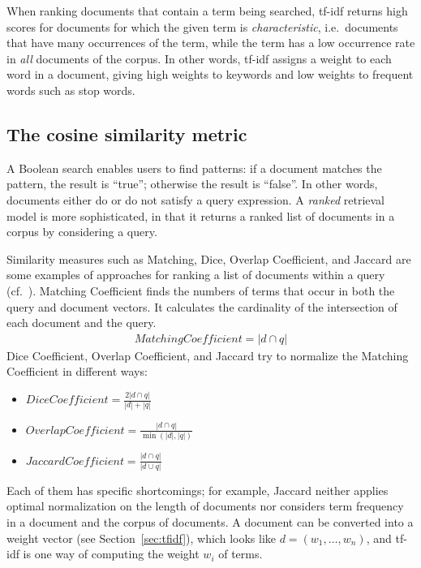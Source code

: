 \documentclass{IOS-Book-Article}
\begin{document}
When ranking documents that contain a term being searched, tf-idf returns high scores for documents for which the given term is \emph{characteristic}, i.e.\ documents that have many occurrences of the term, while the term has a low occurrence rate in \emph{all} documents of the corpus.
In other words, tf-idf assigns a weight to each word in a document, giving high weights to keywords and low weights to frequent words such as stop words.

\subsection{The cosine similarity metric}
\label{sec:cosine}
A Boolean search enables users to find patterns: if a document matches the pattern, the result is “true”; otherwise the result is “false”.
In other words, documents either do or do not satisfy a query expression.
A \emph{ranked} retrieval model is more sophisticated, in that it returns a ranked list of documents in a corpus by considering a query. 

Similarity measures such as Matching, Dice, Overlap Coefficient, and Jaccard are some examples of approaches for ranking a list of documents within a query (cf.~\citet{ChristopherD1999}).
Matching Coefficient finds the numbers of terms that occur in both the query and document vectors.
It calculates the cardinality of the intersection of each document and the query.
\begin{align*}
\mathit{Matching Coefficient}=|d\cap q|
\end{align*}
Dice Coefficient, Overlap Coefficient, and Jaccard try to normalize the Matching Coefficient in different ways:
\begin{itemize}
	\item $\mathit{Dice Coefficient}=\frac{2|d\cap q|}{|d|+|q|}$
	\item $\mathit{Overlap Coefficient}=\frac{|d\cap q|}{\min(|d|,|q|)}$
	\item $\mathit{Jaccard Coefficient}=\frac{|d\cap q|}{|d\cup q|}$
\end{itemize}
Each of them has specific shortcomings;
for example, Jaccard neither applies optimal normalization on the length of documents nor considers term frequency in a document and the corpus of documents.
A document can be converted into a weight vector (see Section~\ref{sec:tfidf}), which looks like $d=(w_1,\dots,w_n)$, and tf-idf is one way of computing the weight $w_i$ of terms.
\end{document}
